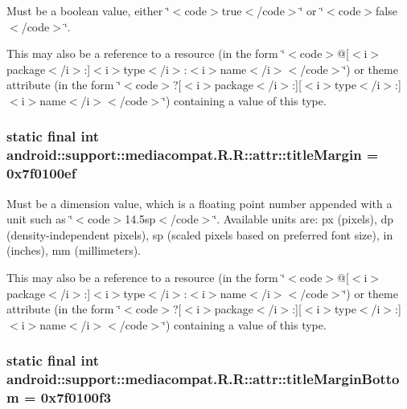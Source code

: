 Must be a boolean value, either \char`\"{}$<$code$>$true$<$/code$>$\char`\"{} or \char`\"{}$<$code$>$false$<$/code$>$\char`\"{}. 

This may also be a reference to a resource (in the form \char`\"{}$<$code$>$@\mbox{[}$<$i$>$package$<$/i$>$:\mbox{]}$<$i$>$type$<$/i$>$:$<$i$>$name$<$/i$>$$<$/code$>$\char`\"{}) or theme attribute (in the form \char`\"{}$<$code$>$?\mbox{[}$<$i$>$package$<$/i$>$:\mbox{]}\mbox{[}$<$i$>$type$<$/i$>$:\mbox{]}$<$i$>$name$<$/i$>$$<$/code$>$\char`\"{}) containing a value of this type. \hypertarget{classandroid_1_1support_1_1mediacompat_1_1_r_1_1attr_45def157a2355ed59f994ace0221b80d}{
\subsubsection[{titleMargin}]{\setlength{\rightskip}{0pt plus 5cm}static final int android::support::mediacompat.R.R::attr::titleMargin = 0x7f0100ef}}
\label{classandroid_1_1support_1_1mediacompat_1_1_r_1_1attr_45def157a2355ed59f994ace0221b80d}


Must be a dimension value, which is a floating point number appended with a unit such as \char`\"{}$<$code$>$14.5sp$<$/code$>$\char`\"{}. Available units are: px (pixels), dp (density-independent pixels), sp (scaled pixels based on preferred font size), in (inches), mm (millimeters). 

This may also be a reference to a resource (in the form \char`\"{}$<$code$>$@\mbox{[}$<$i$>$package$<$/i$>$:\mbox{]}$<$i$>$type$<$/i$>$:$<$i$>$name$<$/i$>$$<$/code$>$\char`\"{}) or theme attribute (in the form \char`\"{}$<$code$>$?\mbox{[}$<$i$>$package$<$/i$>$:\mbox{]}\mbox{[}$<$i$>$type$<$/i$>$:\mbox{]}$<$i$>$name$<$/i$>$$<$/code$>$\char`\"{}) containing a value of this type. \hypertarget{classandroid_1_1support_1_1mediacompat_1_1_r_1_1attr_ed88fdeb796aa2998f6a415bae11fd92}{
\subsubsection[{titleMarginBottom}]{\setlength{\rightskip}{0pt plus 5cm}static final int android::support::mediacompat.R.R::attr::titleMarginBottom = 0x7f0100f3}}
\label{classandroid_1_1support_1_1mediacompat_1_1_r_1_1attr_ed88fdeb796aa2998f6a415bae11fd92}


